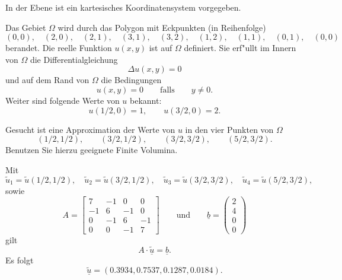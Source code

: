 In der Ebene ist ein kartesisches Koordinatensystem vorgegeben. 

\vspace{2mm}

Das Gebiet $\Omega$ wird durch das Polygon mit Eckpunkten (in Reihenfolge)
\[
(0,0), \quad(2,0), \quad(2,1), \quad(3,1),  \quad(3,2),  \quad(1,2),
\quad(1,1), \quad(0,1), \quad(0,0)
\]
berandet. Die reelle Funktion $u(x,y)$ ist auf $\Omega$ definiert. Sie erf"ullt im Innern von $\Omega$ die Differentialgleichung
\[
\Delta u(x,y) = 0
\]
und auf dem Rand von $\Omega$ die Bedingungen
\[
u(x,y) = 0 \qquad \text{falls} \qquad y \neq 0.
\]
Weiter sind folgende Werte von $u$ bekannt:
\[
u(1/2,0) = 1, \qquad u(3/2,0) = 2.
\]
\vspace{1mm}

Gesucht ist eine Approximation der Werte von $u$ in den vier Punkten
von $\Omega$
\[
(1/2,1/2), \qquad (3/2,1/2), \qquad (3/2,3/2), \qquad (5/2,3/2).
\]
Benutzen Sie hierzu geeignete Finite Volumina.  

\begin{loesung}
Mit 
\[
\tilde u_1 = \tilde u(1/2,1/2), \quad
\tilde u_2 = \tilde u(3/2,1/2), \quad
\tilde u_3 = \tilde u(3/2,3/2), \quad
\tilde u_4 = \tilde u(5/2,3/2), 
\]
sowie 
\[
A = \left[\begin{array}{rrrr} 
7 & -1 & 0 & 0 \\
-1 & 6 & -1 & 0 \\
0 & -1 & 6 & -1 \\ 
0 & 0 & -1 & 7 \end{array}\right]
\qquad
\text{und}
\qquad
\underline{b} =  \left(\begin{array}{r} 2 \\ 4 \\ 0 \\ 0 \end{array}\right) 
\]
gilt 
\[
A \cdot \underline{\tilde u} = \underline{b}.
\]
Es folgt 
\[
\underline{\tilde u} = (0.3934, 0.7537, 0.1287, 0.0184).
\]
\end{loesung}
